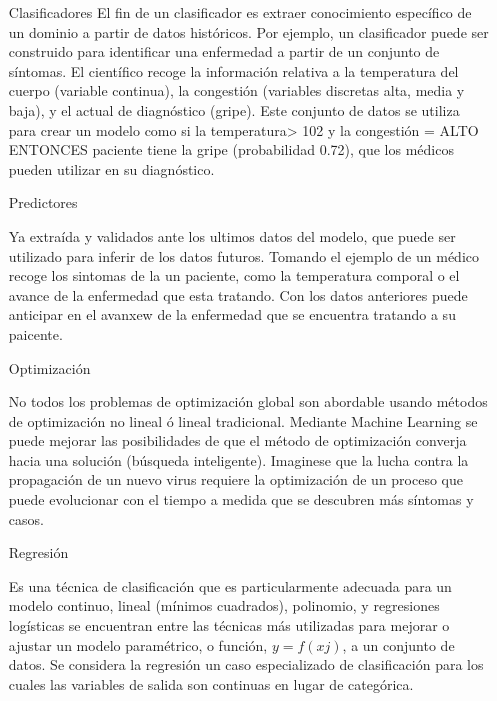 \begin{itemize}
	
	\item[Clasificadores] 
	El fin de un clasificador es extraer conocimiento específico de un dominio a partir de datos históricos. Por ejemplo, un clasificador puede ser construido para identificar una enfermedad a partir de un conjunto de síntomas. El científico recoge la información relativa a la temperatura del cuerpo (variable continua), la congestión (variables discretas alta, media y baja), y el actual de diagnóstico (gripe). Este conjunto de datos se utiliza para crear un modelo como si la temperatura> 102 y la congestión = ALTO ENTONCES paciente tiene la gripe (probabilidad 0.72), que los médicos pueden utilizar en su diagnóstico.

	\item[Predictores]

	Ya extraída y validados ante los ultimos datos del modelo, que puede ser utilizado para inferir de los datos futuros. Tomando el ejemplo de un médico recoge los sintomas de la un paciente, como la temperatura comporal o el avance de la enfermedad que esta tratando. Con los datos anteriores puede anticipar en el avanxew de la enfermedad que se encuentra tratando a su paicente.


	\item[Optimización]

	No todos los problemas de optimización global son abordable usando métodos de optimización no lineal ó lineal tradicional. Mediante Machine Learning se puede mejorar las posibilidades de que el método de optimización converja hacia una solución (búsqueda inteligente). Imaginese que la lucha contra la propagación de un nuevo virus requiere la optimización de un proceso que puede evolucionar con el tiempo a medida que se descubren más síntomas y casos.



	\item[Regresión]

	Es una técnica de clasificación que es particularmente adecuada para un modelo continuo, lineal (mínimos cuadrados), polinomio, y regresiones logísticas se encuentran entre las técnicas más utilizadas para mejorar o ajustar un modelo paramétrico, o función, $y = f ( x j )$, a un conjunto de datos. Se considera la regresión un caso especializado de clasificación para los cuales las variables de salida son continuas en lugar de categórica.


\end{itemize}
\vspace{1cm}


